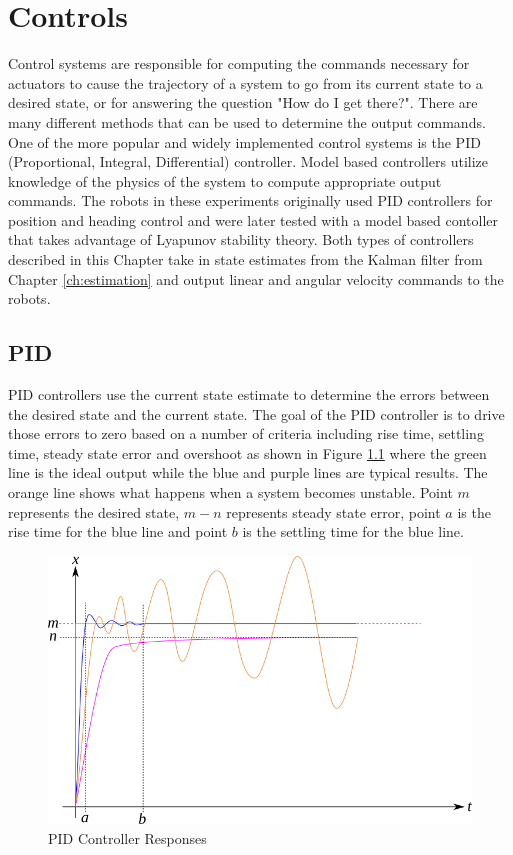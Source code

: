 \chapter{Controls}
\label{ch:controls}
Control systems are responsible for computing the commands necessary for actuators to cause the trajectory of a system to go from its current state to a desired state, or for answering the question "How do I get there?". There are many different methods that can be used to determine the output commands. One of the more popular and widely implemented control systems is the PID (Proportional, Integral, Differential) controller. Model based controllers utilize knowledge of the physics of the system to compute appropriate output commands. The robots in these experiments originally used PID controllers for position and heading control and were later tested with a model based contoller that takes advantage of Lyapunov stability theory. Both types of controllers described in this Chapter take in state estimates from the Kalman filter from Chapter \ref{ch:estimation} and output linear and angular velocity commands to the robots.

\section{PID}
\label{sec:pid}
PID controllers use the current state estimate to determine the errors between the desired state and the current state. The goal of the PID controller is to drive those errors to zero based on a number of criteria including rise time, settling time, steady state error and overshoot as shown in Figure \ref{fig:pid} where the green line is the ideal output while the blue and purple lines are typical results. The orange line shows what happens when a system becomes unstable. Point $m$ represents the desired state, $m-n$ represents steady state error, point $a$ is the rise time for the blue line and point $b$ is the settling time for the blue line.

\begin{figure}[ht!]
	\centering
	\includegraphics[width=.85\textwidth]{images/pid}
	\caption{PID Controller Responses} 
	\label{fig:pid}
\end{figure}

